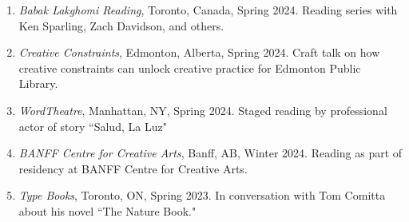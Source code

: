 \begin{enumerate}
    	\item \emph{Babak Lakghomi Reading}, Toronto, Canada, Spring 2024. \subitem Reading series with Ken Sparling, Zach Davidson, and others.  \\
        \item \emph{Creative Constraints}, Edmonton, Alberta, Spring 2024. \subitem Craft talk on how creative constraints can unlock creative practice for Edmonton Public Library.   \\
    \item \emph{WordTheatre}, Manhattan, NY, Spring 2024. \subitem Staged reading by professional actor of story ``Salud, La Luz" \\
      \item \emph{BANFF Centre for Creative Arts}, Banff, AB, Winter 2024. \subitem Reading as part of residency at BANFF Centre for Creative Arts. \\
    
    
    \item \emph{Type Books}, Toronto, ON, Spring 2023. \subitem In conversation with Tom Comitta about his novel ``The Nature Book." \\
    

\end{enumerate}
